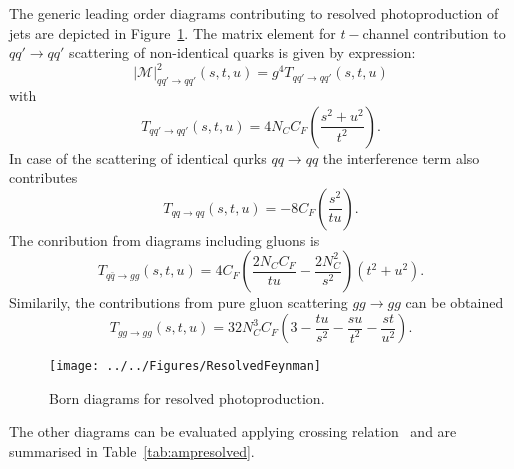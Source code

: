 The generic leading order diagrams contributing to resolved photoproduction of jets are depicted in Figure~\ref{fig:bornresolvedfeyn}. The matrix element for $t-$channel contribution to $qq'\rightarrow qq'$ scattering of non-identical quarks is given by expression:
\begin{equation}
 \left| \mathcal{M} \right|^2_{qq'\rightarrow qq'} \left( s,t,u \right) = g^4T_{qq'\rightarrow qq'}\left( s,t,u \right)
\end{equation}
with 
\begin{equation}
 T_{qq'\rightarrow qq'}\left( s,t,u \right) = 4N_C C_F\left( \frac{s^2+u^2}{t^2} \right).
\end{equation}
In case of the scattering of identical qurks $qq\rightarrow qq$ the interference term also contributes
\begin{equation}
  T_{qq\rightarrow qq}\left( s,t,u \right) = -8C_F\left( \frac{s^2}{tu} \right).
\end{equation}
The conribution from diagrams including gluons is
\begin{equation}
  T_{q\bar{q}\rightarrow gg}\left( s,t,u \right) = 4C_F\left( \frac{2N_C C_F}{tu} - \frac{2N_C^2}{s^2} \right)\left(t^2 + u^2\right). 
\end{equation}
Similarily, the contributions from pure gluon scattering $gg \rightarrow gg$ can be obtained 
\begin{equation}
 T_{gg\rightarrow gg}\left( s,t,u \right) = 32N_C^3C_F\left( 3 - \frac{tu}{s^2} - \frac{su}{t^2} -\frac{st}{u^2}\right). 
\end{equation}

\begin{figure}[h]
 \centering
 \texttt{[image: ../../Figures/ResolvedFeynman]}
 \caption{Born diagrams for resolved photoproduction.}
 \label{fig:bornresolvedfeyn}
\end{figure}
The other diagrams can be evaluated applying crossing relation~\cite{Ell86} and are summarised in Table~\ref{tab:ampresolved}.

